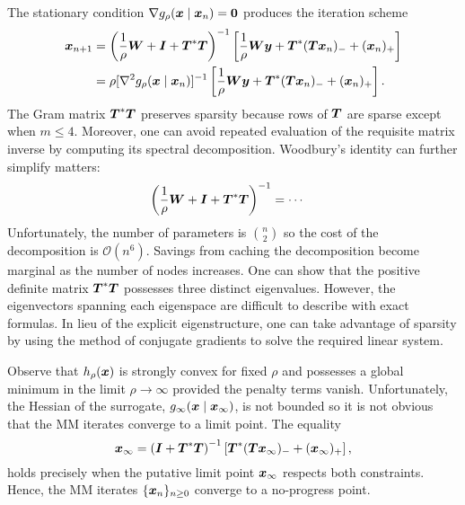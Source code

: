 \documentclass{article}
\begin{document}
The stationary condition \(\nabla g_{\rho}(\boldsymbol{x} \mid \boldsymbol{x}_{n}) = {\bf 0}\) produces the iteration scheme
\begin{equation*}
  \begin{split}
    \boldsymbol{x}_{n+1}
    &=
    \left(
      \frac{1}{\rho} \boldsymbol{W} + \boldsymbol{I} + \boldsymbol{T}^{\ast} \boldsymbol{T}
    \right)^{-1}
    \left[
      \frac{1}{\rho} \boldsymbol{W} \boldsymbol{y}
      +
      \boldsymbol{T}^{\ast} (\boldsymbol{T} \boldsymbol{x}_{n})_{-}
      +
      (\boldsymbol{x}_{n})_{+}
    \right] \\
    &=
    \rho [\nabla^{2} g_{\rho}(\boldsymbol{x} \mid \boldsymbol{x}_{n})]^{-1}
    \left[
      \frac{1}{\rho} \boldsymbol{W} \boldsymbol{y}
      +
      \boldsymbol{T}^{\ast} (\boldsymbol{T} \boldsymbol{x}_{n})_{-}
      +
      (\boldsymbol{x}_{n})_{+}
    \right].
  \end{split}
\end{equation*}
The Gram matrix \(\boldsymbol{T}^{\ast} \boldsymbol{T}\) preserves sparsity because rows of \(\boldsymbol{T}\) are sparse except when \(m \le 4\).
Moreover, one can avoid repeated evaluation of the requisite matrix inverse by computing its spectral decomposition.
Woodbury's identity can further simplify matters:
\begin{equation}
  \label{eq:matrix-inverse}
  \begin{split}
    \left(
      \frac{1}{\rho} \boldsymbol{W} + \boldsymbol{I} + \boldsymbol{T}^{\ast} \boldsymbol{T}
    \right)^{-1}
    &= \cdots
  \end{split}
\end{equation}
Unfortunately, the number of parameters is \(\binom{n}{2}\) so the cost of the decomposition is  \(\mathcal{O}(n^{6})\).
Savings from caching the decomposition become marginal as the number of nodes increases.
One can show that the positive definite matrix \(\boldsymbol{T}^{\ast} \boldsymbol{T}\) possesses three distinct eigenvalues.
However, the eigenvectors spanning each eigenspace are difficult to describe with exact formulas.
In lieu of the explicit eigenstructure, one can take advantage of sparsity by using the method of conjugate gradients to solve the required linear system.

Observe that \(h_{\rho}(\boldsymbol{x})\) is strongly convex for fixed \(\rho\) and possesses a global minimum in the limit \(\rho \to \infty\) provided the penalty terms vanish.
Unfortunately, the Hessian of the surrogate, \(g_{\infty}(\boldsymbol{x} \mid \boldsymbol{x}_{\infty})\), is not bounded so it is not obvious that the MM iterates converge to a limit point.
The equality
\begin{equation*}
  \boldsymbol{x}_{\infty}
  =
  \left(
      \boldsymbol{I} + \boldsymbol{T}^{\ast} \boldsymbol{T}
    \right)^{-1}
    \left[
      \boldsymbol{T}^{\ast} (\boldsymbol{T} \boldsymbol{x}_{\infty})_{-}
      +
      (\boldsymbol{x}_{\infty})_{+}
    \right],
\end{equation*}
holds precisely when the putative limit point \(\boldsymbol{x}_{\infty}\) respects both constraints.
Hence, the MM iterates \(\{\boldsymbol{x}_{n}\}_{n \ge 0}\) converge to a no-progress point.
\end{document}

